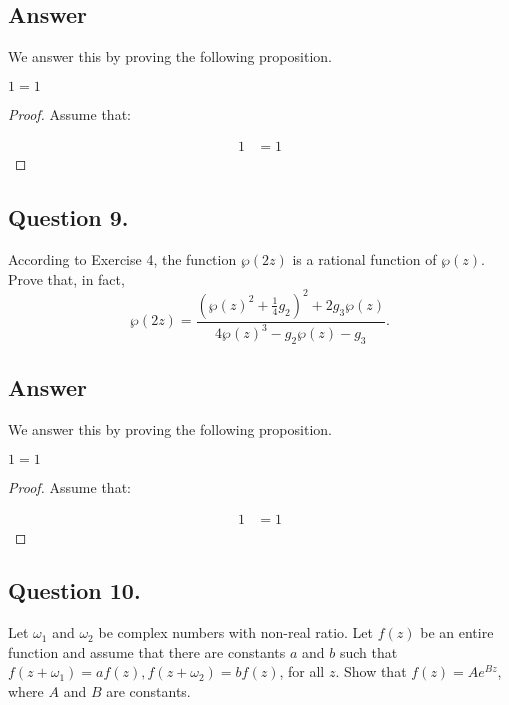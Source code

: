 \subsection*{Answer}
\noindent
We answer this by proving the following proposition.

\begin{proposition}
    $1=1$
\end{proposition}

\begin{proof}
    Assume that:

    \begin{align*}
        1 &= 1
    \end{align*}

\end{proof}


\subsection{Question 9.}
\noindent
According to Exercise 4, the function $\wp(2z)$ is a rational function of $\wp(z)$. Prove that, in fact,
\[
    \wp(2z) = \frac{(\wp(z)^2 + \frac{1}{4}g_2)^2+2g_3\wp(z)}{4\wp(z)^3-g_2\wp(z)-g_3}.
\]

\subsection*{Answer}
\noindent
We answer this by proving the following proposition.

\begin{proposition}
    $1=1$
\end{proposition}

\begin{proof}
    Assume that:

    \begin{align*}
        1 &= 1
    \end{align*}

\end{proof}


\subsection{Question 10.}
\noindent
Let $\omega_1$ and $\omega_2$ be complex numbers with non-real ratio. Let $f(z)$ be an entire function and
assume that there are constants $a$ and $b$ such that $f(z+\omega_1)=a f(z), f(z+\omega_2)=b f(z)$, for all $z$.
Show that $f(z) = A e^{Bz}$, where $A$ and $B$ are constants.

